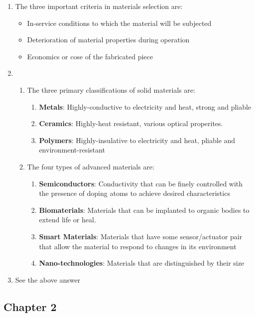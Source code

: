\documentclass{article}
\begin{document}
\begin{enumerate}
\item The three important criteria in materials selection are:
\begin{itemize}
    \item In-service conditions to which the material will be subjected
    \item Deterioration of material properties during operation
    \item Economics or cose of the fabricated piece
\end{itemize}

\item \begin{enumerate}
    \item The three primary classifications of solid materials are:
    \begin{enumerate}
        \item \textbf{Metals}: Highly-conductive to electricity and heat, strong and pliable
        \item \textbf{Ceramics}: Highly-heat resistant, various optical properites.
        \item \textbf{Polymers}: Highly-insulative to electricity and heat, pliable and environment-resistant
    \end{enumerate}
    \item The four types of advanced materials are:
    \begin{enumerate}
        \item \textbf{Semiconductors}: Conductivity that can be finely controlled with the presence of doping atoms to achieve desired characteristics
        \item \textbf{Biomaterials}: Materials that can be implanted to organic bodies to extend life or heal.
        \item \textbf{Smart Materials}: Materials that have some sensor/actuator pair that allow the material to respond to changes in its environment
        \item \textbf{Nano-technologies}: Materials that are distinguished by their size
    \end{enumerate}
\end{enumerate}
\item See the above answer
\end{enumerate}

\subsection{Chapter 2}
\end{document}
